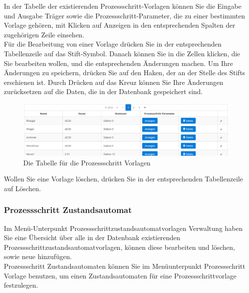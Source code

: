 \documentclass[enabledeprecatedfontcommands,fontsize=12pt,paper=a4,twoside]{scrartcl}
\begin{document}
In der Tabelle der existierenden Prozessschritt-Vorlagen können Sie die Eingabe und Ausgabe Träger sowie die Prozessschritt-Parameter, die zu einer bestimmten Vorlage gehören, mit Klicken auf Anzeigen in den entsprechenden Spalten der zugehörigen Zeile einsehen. \\

Für die Bearbeitung von einer Vorlage drücken Sie in der entsprechenden Tabellenzeile auf das Stift-Symbol. Danach können Sie in die Zellen klicken, die Sie bearbeiten wollen, und die entsprechenden Änderungen machen. Um Ihre Änderungen zu speichern, drücken Sie auf den Haken, der an der Stelle des Stifts erschienen ist. Durch Drücken auf das Kreuz können Sie Ihre Änderungen zurücksetzen auf die Daten, die in der Datenbank gespeichert sind. \\

\begin{figure}[h!]
\begin{center}
 \includegraphics[width=\textwidth]{screenshots/pk/prozessschrittvorlagetabelle.png}
  \caption{Die Tabelle für die Prozessschritt Vorlagen}
  \label{fig:boat2}
\end{center}
\end{figure}


Wollen Sie eine Vorlage löschen, drücken Sie in der entsprechenden Tabellenzeile auf Löschen. \\


\subsubsection{Prozessschritt Zustandsautomat}

Im Menü-Unterpunkt Prozessschrittzustandsautomatvorlagen Verwaltung haben Sie eine Übersicht über alle in der Datenbank existierenden Prozessschrittzustandsautomatvorlagen, können diese bearbeiten und löschen, sowie neue hinzufügen. \\

Prozessschritt Zustandsautomaten können Sie im Menüunterpunkt Prozessschritt Vorlage benutzen, um einen Zustandsautomaten für eine Prozessschrittvorlage festzulegen. \\
\end{document}
